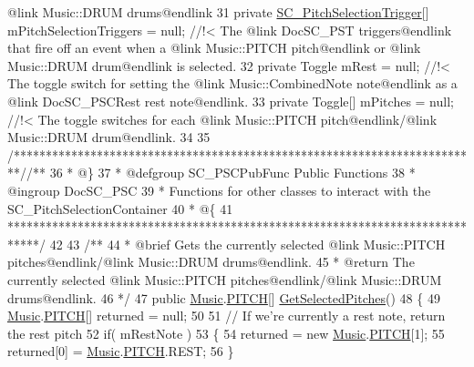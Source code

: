 \begin{DoxyCodeInclude}
{       @link Music::DRUM drums@endlink}
31 \textcolor{comment}{}    \textcolor{keyword}{private} \hyperlink{class_s_c___pitch_selection_trigger}{SC\_PitchSelectionTrigger}[] mPitchSelectionTriggers = null; \textcolor{comment}{//!< The
       @link DocSC\_PST triggers@endlink that fire off an event when a @link Music::PITCH pitch@endlink or @link
       Music::DRUM drum@endlink is selected.}
32 \textcolor{comment}{}    \textcolor{keyword}{private} Toggle mRest = null; \textcolor{comment}{//!< The toggle switch for setting the @link Music::CombinedNote
       note@endlink as a @link DocSC\_PSCRest rest note@endlink.}
33 \textcolor{comment}{}    \textcolor{keyword}{private} Toggle[] mPitches = null; \textcolor{comment}{//!< The toggle switches for each @link Music::PITCH
       pitch@endlink/@link Music::DRUM drum@endlink.}
34 \textcolor{comment}{}
35     \textcolor{comment}{/*************************************************************************/}\textcolor{comment}{/** }
36 \textcolor{comment}{     * @\}}
37 \textcolor{comment}{     * @defgroup SC\_PSCPubFunc Public Functions}
38 \textcolor{comment}{     * @ingroup DocSC\_PSC}
39 \textcolor{comment}{     * Functions for other classes to interact with the SC\_PitchSelectionContainer}
40 \textcolor{comment}{     * @\{}
41 \textcolor{comment}{    *****************************************************************************/}
42 \textcolor{comment}{}
43 \textcolor{comment}{    /**}
44 \textcolor{comment}{     * @brief Gets the currently selected @link Music::PITCH pitches@endlink/@link Music::DRUM
       drums@endlink.}
45 \textcolor{comment}{     * @return The currently selected @link Music::PITCH pitches@endlink/@link Music::DRUM drums@endlink.}
46 \textcolor{comment}{    */}
47     \textcolor{keyword}{public} \hyperlink{class_music}{Music}.\hyperlink{group___music_enums_ga508f69b199ea518f935486c990edac1d}{PITCH}[] \hyperlink{group___s_c___p_s_c_pub_func_ga05750cc6e1199f1522f8b87d6579dc34}{GetSelectedPitches}()
48     \{
49         \hyperlink{class_music}{Music}.\hyperlink{group___music_enums_ga508f69b199ea518f935486c990edac1d}{PITCH}[] returned = null;
50 
51         \textcolor{comment}{// If we're currently a rest note, return the rest pitch}
52         \textcolor{keywordflow}{if}( mRestNote )
53         \{
54             returned = \textcolor{keyword}{new} \hyperlink{class_music}{Music}.\hyperlink{group___music_enums_ga508f69b199ea518f935486c990edac1d}{PITCH}[1];
55             returned[0] = \hyperlink{class_music}{Music}.\hyperlink{group___music_enums_ga508f69b199ea518f935486c990edac1d}{PITCH}.REST;
56         \}

\end{DoxyCodeInclude}
